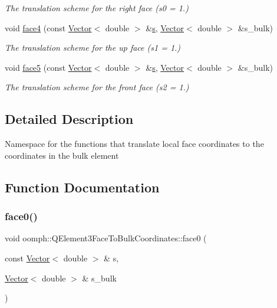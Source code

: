 \begin{DoxyCompactItemize}
\begin{DoxyCompactList}\small\item\em The translation scheme for the right face (s0 = 1.) \end{DoxyCompactList}\item 
void \hyperlink{namespaceoomph_1_1QElement3FaceToBulkCoordinates_a18050dd9aefd4134861982ea39a9c5b5}{face4} (const \hyperlink{classoomph_1_1Vector}{Vector}$<$ double $>$ \&\hyperlink{cfortran_8h_ab7123126e4885ef647dd9c6e3807a21c}{s}, \hyperlink{classoomph_1_1Vector}{Vector}$<$ double $>$ \&s\+\_\+bulk)
\begin{DoxyCompactList}\small\item\em The translation scheme for the up face (s1 = 1.) \end{DoxyCompactList}\item 
void \hyperlink{namespaceoomph_1_1QElement3FaceToBulkCoordinates_a94e7b485fee86028127004c7913831ab}{face5} (const \hyperlink{classoomph_1_1Vector}{Vector}$<$ double $>$ \&\hyperlink{cfortran_8h_ab7123126e4885ef647dd9c6e3807a21c}{s}, \hyperlink{classoomph_1_1Vector}{Vector}$<$ double $>$ \&s\+\_\+bulk)
\begin{DoxyCompactList}\small\item\em The translation scheme for the front face (s2 = 1.) \end{DoxyCompactList}\end{DoxyCompactItemize}


\subsection{Detailed Description}
Namespace for the functions that translate local face coordinates to the coordinates in the bulk element 

\subsection{Function Documentation}
\mbox{\label{namespaceoomph_1_1QElement3FaceToBulkCoordinates_a578392accb58b015e051ac3fd65e9539}} 
\subsubsection{\texorpdfstring{face0()}{face0()}}
{\footnotesize\ttfamily void oomph\+::\+Q\+Element3\+Face\+To\+Bulk\+Coordinates\+::face0 (\begin{DoxyParamCaption}\item[{const \hyperlink{classoomph_1_1Vector}{Vector}$<$ double $>$ \&}]{s,  }\item[{\hyperlink{classoomph_1_1Vector}{Vector}$<$ double $>$ \&}]{s\+\_\+bulk }\end{DoxyParamCaption})}



